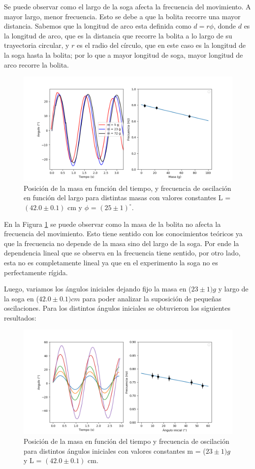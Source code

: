 \documentclass[12pt,a4]{article}
\begin{document}
Se puede observar como el largo de la soga afecta la frecuencia del movimiento. A mayor largo, menor frecuencia. Esto se debe a que la bolita recorre una mayor distancia. Sabemos que la longitud de arco esta definida como $d = r \phi$, donde $d$ es la longitud de arco, que es la distancia que recorre la bolita a lo largo de su trayectoria circular, y $r$ es el radio del círculo, que en este caso es la longitud de la soga hasta la bolita; por lo que a mayor longitud de soga, mayor longitud de arco recorre la bolita.

\begin{figure}[H]
    \centering
    \includegraphics[width=0.6\linewidth]{peso.png}
    \caption{Posición de la masa en función del tiempo, y frecuencia de oscilación en función del largo para distintas masas con valores constantes L = $(42.0 \pm 0.1)$ cm y $\phi$ = $(25 \pm 1) ^\circ$.}
    \label{fig:masa}
\end{figure}

En la Figura \ref{fig:masa} se puede observar como la masa de la bolita no afecta la frecuencia del movimiento. Esto tiene sentido con los conocimientos teóricos ya que la frecuencia no depende de la masa sino del largo de la soga. Por ende la dependencia lineal que se observa en la frecuencia tiene sentido, por otro lado, esta no es completamente lineal ya que en el experimento la soga no es perfectamente rígida. 

Luego, variamos los ángulos iniciales dejando fijo la masa en ($23 \pm 1) g$ y largo de la soga en ($42.0 \pm 0.1) cm$ para poder analizar la suposición de pequeñas oscilaciones. Para los distintos ángulos iniciales se obtuvieron los siguientes resultados:

\begin{figure}[H]
    \centering
    \includegraphics[width=0.6\linewidth]{angulos.png}
    \caption{Posición de la masa en función del tiempo y frecuencia de oscilación para distintos ángulos iniciales con valores constantes m = ($23 \pm 1) g$ y L = $(42.0\pm0.1)$ cm.}
    \label{fig:angulos}
\end{figure}
\end{document}
